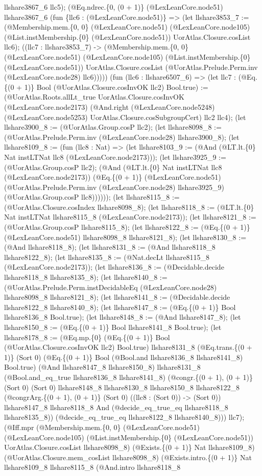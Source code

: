 \documentclass[11pt]{article}
\begin{document}
llshare3867\_6 llc5); (@Eq.ndrec.\{0, (0 + 1)\} (@LexLeanCore.node51) llshare3867\_6 (fun \{llc6 : (@LexLeanCore.node51)\} => (let llshare3853\_7 := (@Membership.mem.\{0, 0\} (@LexLeanCore.node51) (@LexLeanCore.node105) (@List.instMembership.\{0\} (@LexLeanCore.node51)) UorAtlas.Closure.cosList llc6); ((llc7 : llshare3853\_7) -> (@Membership.mem.\{0, 0\} (@LexLeanCore.node51) (@LexLeanCore.node105) (@List.instMembership.\{0\} (@LexLeanCore.node51)) UorAtlas.Closure.cosList (@UorAtlas.Prelude.Perm.inv (@LexLeanCore.node28) llc6))))) (fun (llc6 : llshare6507\_6) => (let llc7 : (@Eq.\{(0 + 1)\} Bool (@UorAtlas.Closure.cosInvOK llc2) Bool.true) := (@UorAtlas.Roots.allLt\_true UorAtlas.Closure.cosInvOK (@LexLeanCore.node2173) (@And.right (@LexLeanCore.node5248) (@LexLeanCore.node5253) UorAtlas.Closure.cosSubgroupCert) llc2 llc4); (let llshare3900\_8 := (@UorAtlas.Group.cosP llc2); (let llshare8098\_8 := (@UorAtlas.Prelude.Perm.inv (@LexLeanCore.node28) llshare3900\_8); (let llshare8109\_8 := (fun (llc8 : Nat) => (let llshare8103\_9 := (@And (@LT.lt.\{0\} Nat instLTNat llc8 (@LexLeanCore.node2173))); (let llshare3925\_9 := (@UorAtlas.Group.cosP llc2); (@And (@LT.lt.\{0\} Nat instLTNat llc8 (@LexLeanCore.node2173)) (@Eq.\{(0 + 1)\} (@LexLeanCore.node51) (@UorAtlas.Prelude.Perm.inv (@LexLeanCore.node28) llshare3925\_9) (@UorAtlas.Group.cosP llc8)))))); (let llshare8115\_8 := (@UorAtlas.Closure.cosIndex llshare8098\_8); (let llshare8118\_8 := (@LT.lt.\{0\} Nat instLTNat llshare8115\_8 (@LexLeanCore.node2173)); (let llshare8121\_8 := (@UorAtlas.Group.cosP llshare8115\_8); (let llshare8122\_8 := (@Eq.\{(0 + 1)\} (@LexLeanCore.node51) llshare8098\_8 llshare8121\_8); (let llshare8130\_8 := (@And llshare8118\_8); (let llshare8131\_8 := (@And llshare8118\_8 llshare8122\_8); (let llshare8135\_8 := (@Nat.decLt llshare8115\_8 (@LexLeanCore.node2173)); (let llshare8136\_8 := (@Decidable.decide llshare8118\_8 llshare8135\_8); (let llshare8140\_8 := (@UorAtlas.Prelude.Perm.instDecidableEq (@LexLeanCore.node28) llshare8098\_8 llshare8121\_8); (let llshare8141\_8 := (@Decidable.decide llshare8122\_8 llshare8140\_8); (let llshare8147\_8 := (@Eq.\{(0 + 1)\} Bool llshare8136\_8 Bool.true); (let llshare8148\_8 := (@And llshare8147\_8); (let llshare8150\_8 := (@Eq.\{(0 + 1)\} Bool llshare8141\_8 Bool.true); (let llshare8178\_8 := (@Eq.mp.\{0\} (@Eq.\{(0 + 1)\} Bool (@UorAtlas.Closure.cosInvOK llc2) Bool.true) llshare8131\_8 (@Eq.trans.\{(0 + 1)\} (Sort 0) (@Eq.\{(0 + 1)\} Bool (@Bool.and llshare8136\_8 llshare8141\_8) Bool.true) (@And llshare8147\_8 llshare8150\_8) llshare8131\_8 (@Bool.and\_eq\_true llshare8136\_8 llshare8141\_8) (@congr.\{(0 + 1), (0 + 1)\} (Sort 0) (Sort 0) llshare8148\_8 llshare8130\_8 llshare8150\_8 llshare8122\_8 (@congrArg.\{(0 + 1), (0 + 1)\} (Sort 0) ((llc8 : (Sort 0)) -> (Sort 0)) llshare8147\_8 llshare8118\_8 And (@decide\_eq\_true\_eq llshare8118\_8 llshare8135\_8)) (@decide\_eq\_true\_eq llshare8122\_8 llshare8140\_8))) llc7); (@Iff.mpr (@Membership.mem.\{0, 0\} (@LexLeanCore.node51) (@LexLeanCore.node105) (@List.instMembership.\{0\} (@LexLeanCore.node51)) UorAtlas.Closure.cosList llshare8098\_8) (@Exists.\{(0 + 1)\} Nat llshare8109\_8) (@UorAtlas.Closure.mem\_cosList llshare8098\_8) (@Exists.intro.\{(0 + 1)\} Nat llshare8109\_8 llshare8115\_8 (@And.intro llshare8118\_8 
\end{document}
